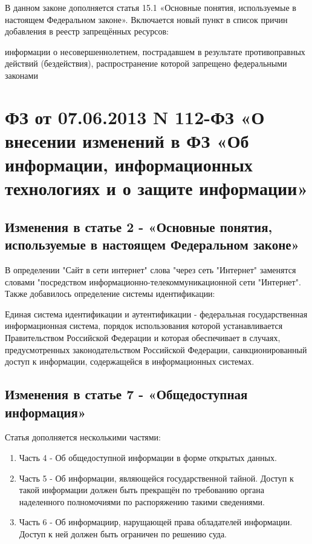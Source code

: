 \documentclass[14pt,a4paper,report]{article}
\begin{document}
В данном законе дополняется статья 15.1 «Основные понятия, используемые в настоящем Федеральном законе».
Включается новый пункт в список причин добавления в реестр запрещённых ресурсов:
\begin{displayquote}
	информации о несовершеннолетнем, пострадавшем в результате противоправных действий (бездействия), распространение которой запрещено федеральными законами
\end{displayquote}

\section{ФЗ от 07.06.2013 N 112-ФЗ «О внесении изменений в ФЗ «Об информации, информационных технологиях и о защите информации»}

\subsection{Изменения в статье 2 - «Основные понятия, используемые в настоящем Федеральном законе»}
В определении "Сайт в сети интернет" слова "через сеть "Интернет" заменятся словами "посредством информационно-телекоммуникационной сети "Интернет". \\

Также добавилось определение системы идентификации:

\begin{displayquote}
	Единая система идентификации и аутентификации - федеральная государственная информационная система, порядок использования которой устанавливается Правительством Российской Федерации и которая обеспечивает в случаях, предусмотренных законодательством Российской Федерации, санкционированный доступ к информации, содержащейся в информационных системах.
\end{displayquote}

\subsection{Изменения в статье 7 - «Общедоступная информация»}
Статья дополняется несколькими частями:
\begin{enumerate}
	\item Часть 4 - Об общедоступной информации в форме открытых данных.
	\item Часть 5 - Об информации, являющейся государственной тайной. Доступ к такой информации должен быть прекращён по требованию органа наделенного полномочиями по распоряжению такими сведениями.
	\item Часть 6 - Об информациир, нарущающей права обладателей информации. Доступ к ней должен быть ограничен по решению суда.
\end{enumerate}
\end{document}
